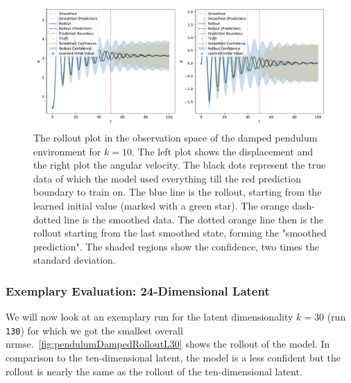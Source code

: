 			\begin{figure}
				\centering
				\includegraphics[width=\linewidth]{figures/results/pendulum-damped/run-latent-dim-10/rollout-observations-N0.pdf}
				\caption{The rollout plot in the observation space of the damped pendulum environment for \(k = 10\). The left plot shows the displacement and the right plot the angular velocity. The black dots represent the true data of which the model used everything till the red prediction boundary to train on. The blue line is the rollout, starting from the learned initial value (marked with a green star). The orange dash-dotted line is the smoothed data. The dotted orange line then is the rollout starting from the last smoothed state, forming the "smoothed prediction". The shaded regions show the confidence, \ie two times the standard deviation.}
				\label{fig:pendulumDampedRolloutL10}
			\end{figure}

		\subsubsection{Exemplary Evaluation: 24-Dimensional Latent}
			We will now look at an exemplary run for the latent dimensionality \( k = 30 \) (run \texttt{130}) for which we got the smallest overall \ac{nrmse}.~\autoref{fig:pendulumDampedRolloutL30} shows the rollout of the model. In comparison to the ten-dimensional latent, the model is a less confident but the rollout is nearly the same as the rollout of the ten-dimensional latent.

